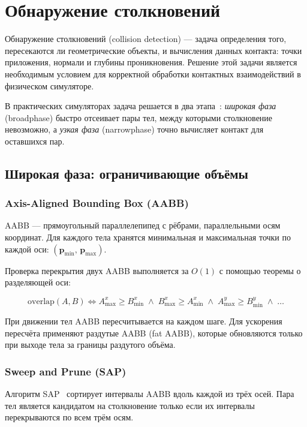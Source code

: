 \section{Обнаружение столкновений}

Обнаружение столкновений (collision detection) --- задача определения того, пересекаются ли геометрические 
объекты, и вычисления данных контакта: точки приложения, нормали и глубины проникновения. Решение этой задачи 
является необходимым условием для корректной обработки контактных взаимодействий в физическом симуляторе.

В практических симуляторах задача решается в два этапа~\cite{ericson2004real}: \emph{широкая фаза} 
(broadphase) быстро отсеивает пары тел, между которыми столкновение невозможно, а \emph{узкая фаза} 
(narrowphase) точно вычисляет контакт для оставшихся пар.

\subsection{Широкая фаза: ограничивающие объёмы}

\subsubsection{Axis-Aligned Bounding Box (AABB)}

AABB --- прямоугольный параллелепипед с рёбрами, параллельными осям координат. Для каждого тела хранятся 
минимальная и максимальная точки по каждой оси: $(\mathbf{p}_{\min},\, \mathbf{p}_{\max})$.

Проверка перекрытия двух AABB выполняется за $O(1)$ с помощью теоремы о разделяющей оси:

\begin{equation}
  \text{overlap}(A, B) \iff
  A_{\max}^x \geq B_{\min}^x \;\wedge\; B_{\max}^x \geq A_{\min}^x \;\wedge\;
  A_{\max}^y \geq B_{\min}^y \;\wedge\; \ldots
  \label{eq:aabb-test}
\end{equation}

При движении тел AABB пересчитывается на каждом шаге. Для ускорения пересчёта применяют раздутые AABB (fat 
AABB), которые обновляются только при выходе тела за границы раздутого объёма.

\subsubsection{Sweep and Prune (SAP)}

Алгоритм SAP~\cite{cohen1995sahp} сортирует интервалы AABB вдоль каждой из трёх осей. Пара тел является 
кандидатом на столкновение только если их интервалы перекрываются по всем трём осям.

